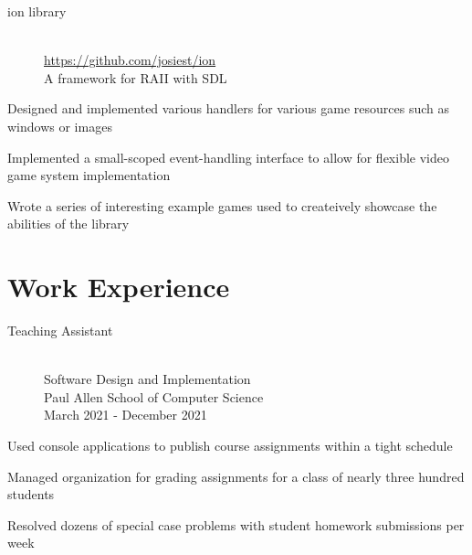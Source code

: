 \documentclass[10pt]{article}
\newenvironment{itemize*}
{\begin{itemize}[leftmargin=*]
    \setlength{\parskip}{0.5pt}}
{\end{itemize}}
\begin{document}
\begin{paracol}{2}
\begin{description}
\item[ion library] \hfill \\
    \url{https://github.com/josiest/ion}\\
    A framework for RAII with SDL
\end{description}
\begin{itemize*}
\item Designed and implemented various handlers for various game resources such
      as windows or images
\item Implemented a small-scoped event-handling interface to allow for flexible
      video game system implementation
\item Wrote a series of interesting example games used to createively showcase
      the abilities of the library
\end{itemize*}

\switchcolumn
\section*{Work Experience}

\begin{description}
\item[Teaching Assistant] \hfill \\
    Software Design and Implementation \\
    Paul Allen School of Computer Science \\
    March 2021 - December 2021
\end{description}
\begin{itemize*}
\item Used console applications to publish course assignments within a tight schedule
\item Managed organization for grading assignments for a class of nearly three
      hundred students
\item Resolved dozens of special case problems with student homework
      submissions per week
\end{itemize*}


\end{paracol}
\end{document}
